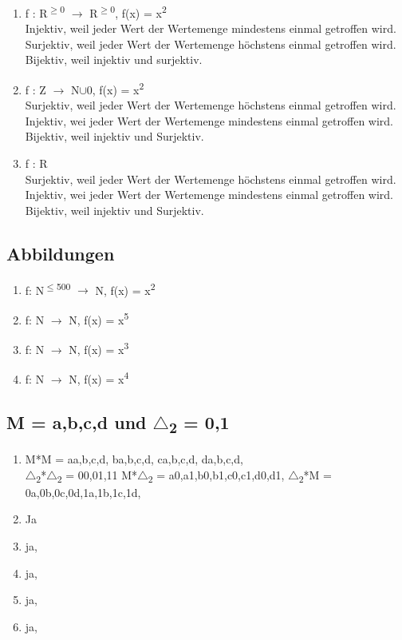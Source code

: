 \begin{enumerate}
    \item f : R\textsuperscript{$\geq$0} $\to$ R\textsuperscript{$\geq$0}, 
    f(x) = x\textsuperscript{2}\\
    {
        \tiny
        Injektiv, weil jeder Wert der Wertemenge mindestens einmal getroffen
        wird. Surjektiv, weil jeder Wert der Wertemenge höchstens einmal
        getroffen wird. Bijektiv, weil injektiv und surjektiv.
    }
    \item f : Z $\to$ N$\cup${0}, f(x) = x\textsuperscript{2}\\
    {
        \tiny
        Surjektiv, weil jeder Wert der Wertemenge höchstens einmal getroffen
        wird. Injektiv, wei jeder Wert der Wertemenge mindestens einmal
        getroffen wird. Bijektiv, weil injektiv und Surjektiv.
    }
    \item f : R\\
    {
        \tiny
        Surjektiv, weil jeder Wert der Wertemenge höchstens einmal getroffen
        wird. Injektiv, wei jeder Wert der Wertemenge mindestens einmal
        getroffen wird. Bijektiv, weil injektiv und Surjektiv.
    }
\end{enumerate}
\subsection{Abbildungen}
\begin{enumerate}
    \item f: N\textsuperscript{$\leq$500} $\to$ N, f(x) = x\textsuperscript{2}\\
    \item f: N $\to$ N, f(x) = x\textsuperscript{5}
    \item f: N $\to$ N, f(x) = x\textsuperscript{3}
    \item f: N $\to$ N, f(x) = x\textsuperscript{4}
\end{enumerate}
\subsection{M = {a,b,c,d} und $\triangle$\textsubscript{2} = {0,1}}
\begin{enumerate}
    \item M*M = {
        a{a,b,c,d},
        b{a,b,c,d},
        c{a,b,c,d},
        d{a,b,c,d},
    }\\ $\triangle$\textsubscript{2}*$\triangle$\textsubscript{2} ={
        00,01,11
    } M*$\triangle$\textsubscript{2} ={
        a0,a1,b0,b1,c0,c1,d0,d1,
    } $\triangle$\textsubscript{2}*M ={
        0a,0b,0c,0d,1a,1b,1c,1d,
    }
    \item Ja
        \item ja,
        \item ja,
        \item ja,
        \item ja,
\end{enumerate}
